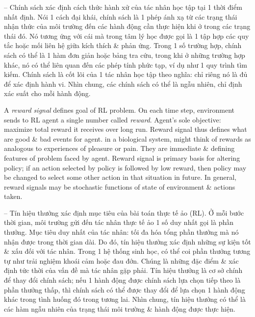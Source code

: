 \documentclass{article}
\begin{document}
\begin{itemize}
\begin{itemize}
        -- Chính sách xác định cách thức hành xử của tác nhân học tập tại 1 thời điểm nhất định. Nói 1 cách đại khái, chính sách là 1 phép ánh xạ từ các trạng thái nhận thức của môi trường đến các hành động cần thực hiện khi ở trong các trạng thái đó. Nó tương ứng với cái mà trong tâm lý học được gọi là 1 tập hợp các quy tắc hoặc mối liên hệ giữa kích thích \& phản ứng. Trong 1 số trường hợp, chính sách có thể là 1 hàm đơn giản hoặc bảng tra cứu, trong khi ở những trường hợp khác, nó có thể liên quan đến các phép tính phức tạp, ví dụ như 1 quy trình tìm kiếm. Chính sách là cốt lõi của 1 tác nhân học tập theo nghĩa: chỉ riêng nó là đủ để xác định hành vi. Nhìn chung, các chính sách có thể là ngẫu nhiên, chỉ định xác suất cho mỗi hành động.

        A {\it reward signal} defines goal of RL problem. On each time step, environment sends to RL agent a single number called {\it reward}. Agent's sole objective: maximize total reward it receives over long run. Reward signal thus defines what are good \& bad events for agent. in a biological system, might think of rewards as analogous to experiences of pleasure or pain. They are immediate \& defining features of problem faced by agent. Reward signal is primary basis for altering policy; if an action selected by policy is followed by low reward, then policy may be changed to select some other action in that situation in future. In general, reward signals may be stochastic functions of state of environment \& actions taken.

        -- Tín hiệu thưởng xác định mục tiêu của bài toán thực tế ảo (RL). Ở mỗi bước thời gian, môi trường gửi đến tác nhân thực tế ảo 1 số duy nhất gọi là {phần thưởng}. Mục tiêu duy nhất của tác nhân: tối đa hóa tổng phần thưởng mà nó nhận được trong thời gian dài. Do đó, tín hiệu thưởng xác định những sự kiện tốt \& xấu đối với tác nhân. Trong 1 hệ thống sinh học, có thể coi phần thưởng tương tự như trải nghiệm khoái cảm hoặc đau đớn. Chúng là những đặc điểm \& xác định tức thời của vấn đề mà tác nhân gặp phải. Tín hiệu thưởng là cơ sở chính để thay đổi chính sách; nếu 1 hành động được chính sách lựa chọn tiếp theo là phần thưởng thấp, thì chính sách có thể được thay đổi để lựa chọn 1 hành động khác trong tình huống đó trong tương lai. Nhìn chung, tín hiệu thưởng có thể là các hàm ngẫu nhiên của trạng thái môi trường \& hành động được thực hiện.


\end{itemize}
\end{itemize}
\end{document}
